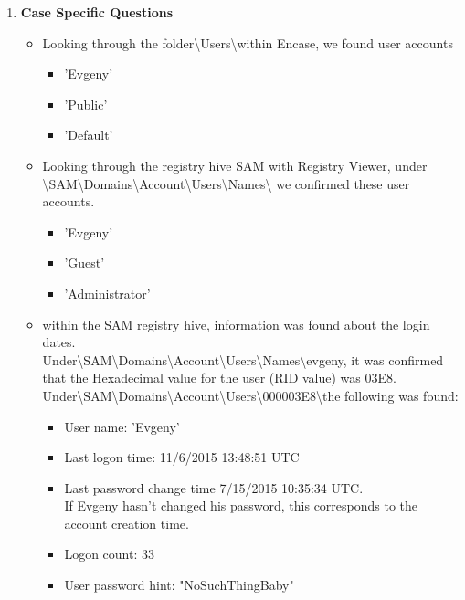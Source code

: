 \begin{enumerate}
\begin{itemize}
		
		
		
	\end{itemize}

\item \textbf{Case Specific Questions}

	\begin{itemize}
		
		\item Looking through the folder\textbackslash Users\textbackslash within Encase, we found user accounts 
		
		\begin{itemize}
			\item 'Evgeny'
			\item 'Public'
			\item 'Default'
		\end{itemize} 
		
		\item Looking through the registry hive SAM with Registry Viewer, under
		\textbackslash SAM\textbackslash Domains\textbackslash Account\textbackslash Users\textbackslash Names\textbackslash
		 we confirmed these user accounts.
		
		\begin{itemize}
			\item 'Evgeny'
			\item 'Guest'
			\item 'Administrator'
		\end{itemize}
		
		\item within the SAM registry hive, information was found about the login dates.\\ 
		Under\textbackslash SAM\textbackslash Domains\textbackslash Account\textbackslash Users\textbackslash Names\textbackslash evgeny, it was confirmed that the Hexadecimal value for the user (RID value) was 03E8. 
		Under\textbackslash SAM\textbackslash Domains\textbackslash Account\textbackslash Users\textbackslash 000003E8\textbackslash the following was found:
		
		\begin{itemize}
		\item User name: 'Evgeny'
		\item Last logon time: 11/6/2015 13:48:51 UTC
		\item Last password change time 7/15/2015 10:35:34 UTC.\\
		If Evgeny hasn't changed his password, this corresponds to the account creation time.
		\item Logon count: 33
		\item User password hint: "NoSuchThingBaby"
		\end{itemize}
		

\end{itemize}
\end{enumerate}
